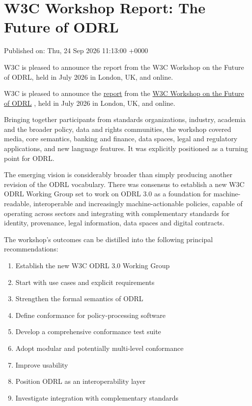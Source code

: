 \documentclass[11pt,a4paper]{article}
\begin{document}
\section{W3C Workshop Report: The Future of ODRL}

Published on: Thu, 24 Sep 2026 11:13:00 +0000

W3C is pleased to announce the report from the W3C Workshop on the Future of ODRL, held in July 2026 in London, UK, and online.

W3C is pleased to announce the \href{https://www.w3.org/2026/ODRLWS/report.html}{report} from the \href{https://www.w3.org/2026/ODRLWS/index.html}{W3C Workshop on the Future of ODRL} , held in July 2026 in London, UK, and online.

Bringing together participants from standards organizations, industry, academia and the broader policy, data and rights communities, the workshop covered media, core semantics, banking and finance, data spaces, legal and regulatory applications, and new language features. It was explicitly positioned as a turning point for ODRL.

The emerging vision is considerably broader than simply producing another revision of the ODRL vocabulary. There was consensus to establish a new W3C ODRL Working Group set to work on ODRL 3.0 as a foundation for machine-readable, interoperable and increasingly machine-actionable policies, capable of operating across sectors and integrating with complementary standards for identity, provenance, legal information, data spaces and digital contracts.

The workshop's outcomes can be distilled into the following principal recommendations:

\begin{enumerate}
\item Establish the new W3C ODRL 3.0 Working Group
\item Start with use cases and explicit requirements
\item Strengthen the formal semantics of ODRL
\item Define conformance for policy-processing software
\item Develop a comprehensive conformance test suite
\item Adopt modular and potentially multi-level conformance
\item Improve usability
\item Position ODRL as an interoperability layer
\item Investigate integration with complementary standards
\end{enumerate}
\end{document}
